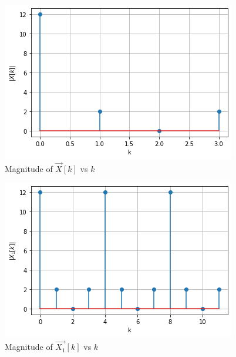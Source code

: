 \documentclass[journal,12pt,twocolumn]{IEEEtran}
\begin{document}
\begin{figure}[!ht]
    \centering
    \includegraphics[width=\columnwidth] {Gate_Assignment_1_Fig_1.png}
    \caption{Magnitude of $\vec{X}[k]$ vs $k$}
    \label{Magnitude of X[k]}
\end{figure}

\begin{figure}[!ht]
    \centering
    \includegraphics[width=\columnwidth] {Gate_Assignment_1_Fig_2.png}
    \caption{Magnitude of $\vec{X_{1}}[k]$ vs $k$}
    \label{Magnitude of X1[k]}
\end{figure}
\end{document}
